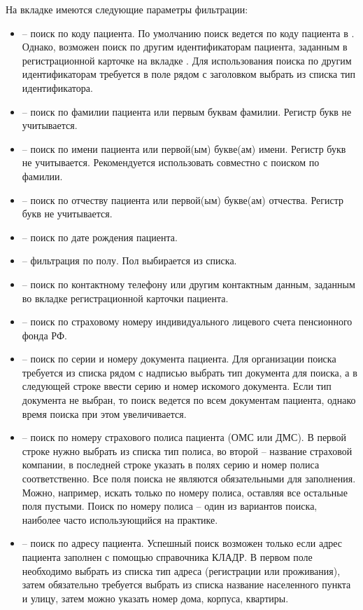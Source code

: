 На вкладке  имеются следующие параметры фильтрации:
\begin{itemize}
 \item {} – поиск по коду пациента. По умолчанию поиск ведется по коду пациента в \tmis. Однако, возможен поиск по другим идентификаторам пациента, заданным в регистрационной карточке на вкладке . Для использования поиска по другим идентификаторам требуется в поле рядом с заголовком  выбрать из списка тип идентификатора.
 \item {} – поиск по фамилии пациента или первым буквам фамилии. Регистр букв не учитывается.
 \item	{} – поиск по имени пациента или первой(ым) букве(ам) имени. Регистр букв не учитывается. Рекомендуется использовать совместно с поиском по фамилии.
 \item	{} – поиск по отчеству пациента или первой(ым) букве(ам) отчества. Регистр букв не учитывается.
 \item	{} – поиск по дате рождения пациента.
 \item	{} – фильтрация по полу. Пол выбирается из списка.
 \item {} – поиск по контактному телефону или другим контактным данным, заданным во вкладке  регистрационной карточки пациента.
 \item	{} – поиск по страховому номеру индивидуального лицевого счета пенсионного фонда РФ.
 \item	{} – поиск по серии и номеру документа пациента. Для организации поиска требуется из списка рядом с надписью  выбрать тип документа для поиска, а в следующей строке ввести серию и номер искомого документа. Если тип документа не выбран, то поиск ведется по всем документам пациента, однако время поиска при этом увеличивается.
 \item	{} – поиск по номеру страхового полиса пациента (ОМС или ДМС). В первой строке нужно выбрать из списка тип полиса, во второй – название страховой компании, в последней строке указать в полях серию и номер полиса соответственно. Все поля поиска не являются обязательными для заполнения. Можно, например, искать только по номеру полиса, оставляя все остальные поля пустыми. Поиск по номеру полиса – один из вариантов поиска, наиболее часто использующийся на практике.
 \item	{} – поиск по адресу пациента. Успешный поиск возможен только если адрес пациента заполнен с помощью справочника КЛАДР. В первом поле необходимо выбрать из списка тип адреса (регистрации или проживания), затем обязательно требуется выбрать из списка название населенного пункта и улицу, затем можно указать номер дома, корпуса, квартиры.

\end{itemize}
